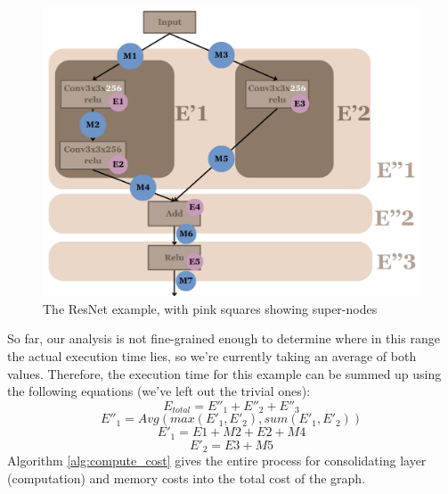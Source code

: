 \documentclass[12pt,a4paper,twoside,openright,bibliography=totocnumbered]{report}
\begin{document}
    \begin{figure}[ht!]
        \begin{center}
		      \includegraphics[scale=0.3]{reportImages/modelPar.png}
        \end{center}	
        \caption{The ResNet example, with pink squares showing super-nodes}
        \label{modelpar}
\end{figure}

    So far, our analysis is not fine-grained enough to determine where in this range the actual execution time lies, so we're currently taking an average of both values.
    Therefore, the execution time for this example can be summed up using the following equations (we've left out the trivial ones):
    \begin{equation}
        E_{total} = E''_1 + E''_2 + E''_3
    \end{equation}
    \begin{equation}
        E''_1 = Avg(max(E'_1, E'_2), sum(E'_1, E'_2))
    \end{equation}
    \begin{equation}
        E'_1 = E1+M2+E2+M4
    \end{equation}
    \begin{equation}
        E'_2 = E3+M5
    \end{equation}
Algorithm \ref{alg:compute_cost} gives the entire process for consolidating layer (computation) and memory costs into the total cost of the graph.
\end{document}
